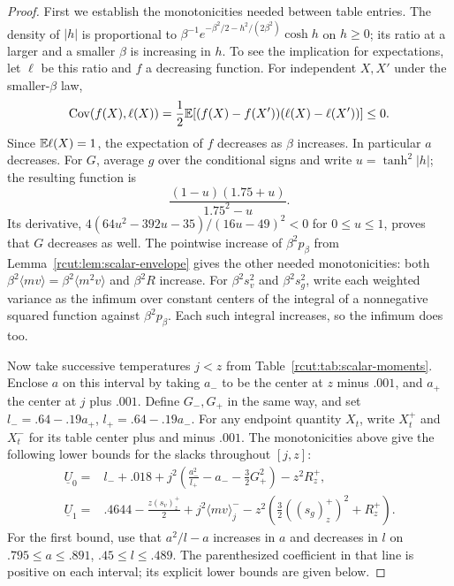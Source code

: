 \begin{proof}
First we establish the monotonicities needed between table entries.
The density of \(|h|\) is proportional to
\(\beta^{-1}e^{-\beta^2/2-h^2/(2\beta^2)}\cosh h\) on \(h\geq0\);
its ratio at a larger and a smaller \(\beta\) is increasing in \(h\).
To see the implication for expectations, let \(\ell\) be this ratio
and \(f\) a decreasing function. For independent \(X,X'\) under the
smaller-\(\beta\) law,
\[
 \operatorname{Cov}(f(X),\ell(X))
 =\frac12\mathbb E[(f(X)-f(X'))(\ell(X)-\ell(X'))]\leq0.
\]
Since \(\mathbb E\ell(X)=1\), the expectation of \(f\) decreases as
\(\beta\) increases. In particular \(a\) decreases. For \(G\),
average \(g\) over the conditional signs and write
\(u=\tanh^2|h|\); the resulting function is
\[
 \frac{(1-u)(1.75+u)}{1.75^2-u}.
\]
Its derivative,
\(4(64u^2-392u-35)/(16u-49)^2<0\) for \(0\leq u\leq1\), proves
that \(G\) decreases as well. The pointwise increase of
\(\beta^2p_\beta\) from Lemma~\ref{rcut:lem:scalar-envelope} gives the
other needed monotonicities: both
\(\beta^2\langle mv\rangle=\beta^2\langle m^2v\rangle\) and
\(\beta^2R\) increase. For \(\beta^2s_v^2\) and \(\beta^2s_g^2\),
write each weighted variance as the infimum over constant centers of
the integral of a nonnegative squared function against
\(\beta^2p_\beta\). Each such integral increases, so the infimum does too.

Now take successive temperatures \(j<z\) from
Table~\ref{rcut:tab:scalar-moments}. Enclose \(a\) on this interval
by taking \(a_-\) to be the center at \(z\) minus \(.001\), and
\(a_+\) the center at \(j\) plus \(.001\). Define \(G_-,G_+\)
in the same way, and set \(l_-=.64-.19a_+\),
\(l_+=.64-.19a_-\). For any endpoint quantity \(X_t\), write
\(X_t^+\) and \(X_t^-\) for its table center plus and minus
\(.001\). The monotonicities above give the following lower bounds
for the slacks throughout \([j,z]\):
\begin{equation}
 \begin{split}
 \underline U_0={}&l_-+.018
   +j^2\left(\frac{a_-^2}{l_+}-a_--\frac32G_+^2\right)-z^2R_z^+,\\
 \underline U_1={}&.4644-\frac{z(s_v)_z^+}{2}
   +j^2\langle mv\rangle_j^-
   -z^2\left(\frac32((s_g)_z^+)^2+R_z^+\right).
 \end{split}
 \label{rcut:eq:scalar-interval-slacks}
\end{equation}
For the first bound, use that \(a^2/l-a\) increases in \(a\) and
decreases in \(l\) on \(.795\leq a\leq.891\),
\(.45\leq l\leq.489\). The parenthesized coefficient in that line
is positive on each interval; its explicit lower bounds are given below.


\end{proof}
